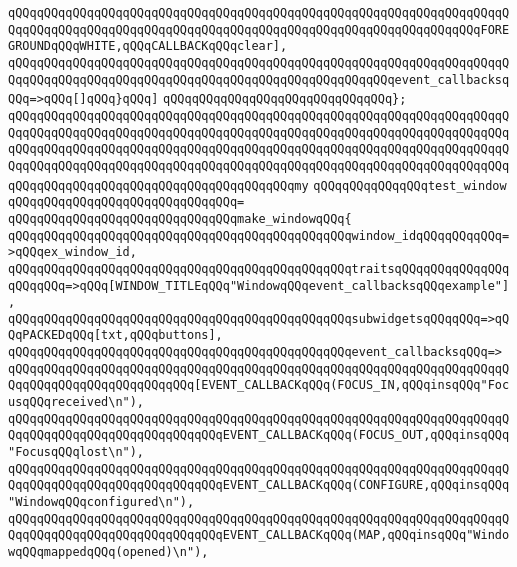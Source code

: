 \verb|qQQqqQQqqQQqqQQqqQQqqQQqqQQqqQQqqQQqqQQqqQQqqQQqqQQqqQQqqQQqqQQqqQQqqQQqqQQqqQQqqQQqqQQqqQQqqQQqqQQqqQQqqQQqqQQqqQQqqQQqqQQqqQQqqQQqqQQqFOREGROUNDqQQqWHITE,qQQqCALLBACKqQQqclear],|\newline
\verb|qQQqqQQqqQQqqQQqqQQqqQQqqQQqqQQqqQQqqQQqqQQqqQQqqQQqqQQqqQQqqQQqqQQqqQQqqQQqqQQqqQQqqQQqqQQqqQQqqQQqqQQqqQQqqQQqqQQqqQQqqQQqevent_callbacksqQQq=>qQQq[]qQQq}qQQq]|\newline
\newline
\verb|qQQqqQQqqQQqqQQqqQQqqQQqqQQqqQQq};|\newline
\verb|qQQqqQQqqQQqqQQqqQQqqQQqqQQqqQQqqQQqqQQqqQQqqQQqqQQqqQQqqQQqqQQqqQQqqQQqqQQqqQQqqQQqqQQqqQQqqQQqqQQqqQQqqQQqqQQqqQQqqQQqqQQqqQQqqQQqqQQqqQQqqQQqqQQqqQQqqQQqqQQqqQQqqQQqqQQqqQQqqQQqqQQqqQQqqQQqqQQqqQQqqQQqqQQqqQQqqQQqqQQqqQQqqQQqqQQqqQQqqQQqqQQqqQQqqQQqqQQqqQQqqQQqqQQqqQQqqQQqqQQqqQQqqQQqqQQqqQQqqQQqqQQqqQQqqQQqqQQqqQQqmy|\newline
\verb|qQQqqQQqqQQqqQQqtest_window|\newline
\verb|qQQqqQQqqQQqqQQqqQQqqQQqqQQqqQQq=|\newline
\verb|qQQqqQQqqQQqqQQqqQQqqQQqqQQqqQQqmake_windowqQQq{|\newline
\verb|qQQqqQQqqQQqqQQqqQQqqQQqqQQqqQQqqQQqqQQqqQQqqQQqwindow_idqQQqqQQqqQQq=>qQQqex_window_id,|\newline
\verb|qQQqqQQqqQQqqQQqqQQqqQQqqQQqqQQqqQQqqQQqqQQqqQQqtraitsqQQqqQQqqQQqqQQqqQQqqQQq=>qQQq[WINDOW_TITLEqQQq"WindowqQQqevent_callbacksqQQqexample"],|\newline
\verb|qQQqqQQqqQQqqQQqqQQqqQQqqQQqqQQqqQQqqQQqqQQqqQQqsubwidgetsqQQqqQQq=>qQQqPACKEDqQQq[txt,qQQqbuttons],|\newline
\verb|qQQqqQQqqQQqqQQqqQQqqQQqqQQqqQQqqQQqqQQqqQQqqQQqevent_callbacksqQQq=>|\newline
\verb|qQQqqQQqqQQqqQQqqQQqqQQqqQQqqQQqqQQqqQQqqQQqqQQqqQQqqQQqqQQqqQQqqQQqqQQqqQQqqQQqqQQqqQQqqQQqqQQq[EVENT_CALLBACKqQQq(FOCUS_IN,qQQqinsqQQq"FocusqQQqreceived\n"),|\newline
\verb|qQQqqQQqqQQqqQQqqQQqqQQqqQQqqQQqqQQqqQQqqQQqqQQqqQQqqQQqqQQqqQQqqQQqqQQqqQQqqQQqqQQqqQQqqQQqqQQqqQQqEVENT_CALLBACKqQQq(FOCUS_OUT,qQQqinsqQQq"FocusqQQqlost\n"),|\newline
\verb|qQQqqQQqqQQqqQQqqQQqqQQqqQQqqQQqqQQqqQQqqQQqqQQqqQQqqQQqqQQqqQQqqQQqqQQqqQQqqQQqqQQqqQQqqQQqqQQqqQQqEVENT_CALLBACKqQQq(CONFIGURE,qQQqinsqQQq"WindowqQQqconfigured\n"),|\newline
\verb|qQQqqQQqqQQqqQQqqQQqqQQqqQQqqQQqqQQqqQQqqQQqqQQqqQQqqQQqqQQqqQQqqQQqqQQqqQQqqQQqqQQqqQQqqQQqqQQqqQQqEVENT_CALLBACKqQQq(MAP,qQQqinsqQQq"WindowqQQqmappedqQQq(opened)\n"),|\newline
